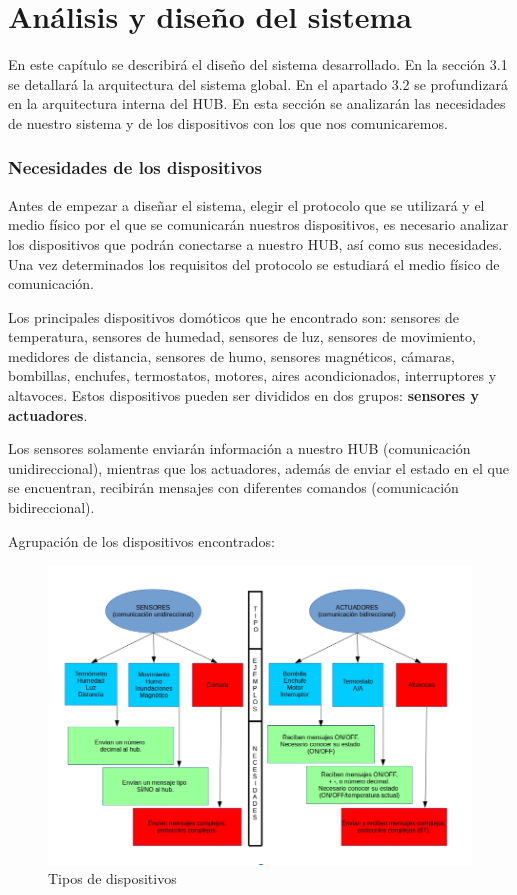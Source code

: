 \chapter{Análisis y diseño del sistema}
\label{chap:analisisydisenosistema}
En este capítulo se describirá el diseño del sistema desarrollado. 
En la sección 3.1 se detallará la arquitectura del sistema global. 
En el apartado 3.2 se profundizará en la arquitectura interna del HUB.
En esta sección se analizarán las necesidades de nuestro sistema y de los dispositivos con los que nos comunicaremos.
\subsection{Necesidades de los dispositivos}
Antes de empezar a diseñar el sistema, elegir el protocolo que se utilizará y el medio físico por el que se comunicarán 
nuestros dispositivos, es necesario analizar los dispositivos que podrán conectarse a nuestro HUB, así como sus necesidades. 
Una vez determinados los requisitos del protocolo se estudiará el medio físico de comunicación.
\par
Los principales dispositivos domóticos que he encontrado son: sensores de temperatura, sensores de humedad, 
sensores de luz, sensores de movimiento, medidores de distancia, sensores de humo, sensores magnéticos, cámaras, 
bombillas, enchufes, termostatos, motores, aires acondicionados, interruptores y altavoces. Estos dispositivos
 pueden ser divididos en dos grupos: \textbf{sensores y actuadores}. 
\par
Los sensores solamente enviarán información a nuestro HUB (comunicación unidireccional), 
mientras que los actuadores, además de enviar el estado en el que se encuentran, recibirán mensajes con diferentes comandos (comunicación bidireccional).
\par
Agrupación de los dispositivos encontrados:

\begin{figure}[H]
\centering
\includegraphics[width=6.00in]{images/descripcion_dispositivos.png}
\caption{Tipos de dispositivos}
\label{fig:descripcion_dispositivos}
\end{figure}


